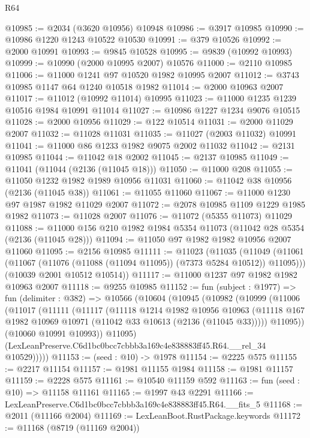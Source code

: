\begin{lexlean}{R64}
\begin{coremodule}
@10985 := @2034 (@3620 @10956) @10948
@10986 := @3917 @10985
@10990 := @10986 @1220 @1243 @10522 @10530
@10991 := @379 @10526
@10992 := @2000 @10991
@10993 := @9845 @10528
@10995 := @9839 (@10992 @10993)
@10999 := @10990 (@2000 @10995 @2007) @10576
@11000 := @2110 @10985
@11006 := @11000 @1241 @97 @10520 @1982 @10995 @2007
@11012 := @3743 @10985 @1147 @64 @1240 @10518 @1982
@11014 := @2000 @10963 @2007
@11017 := @11012 (@10992 @11014) @10995
@11023 := @11000 @1235 @1239 @10516 @1984 @10991 @11014
@11027 := @10986 @1227 @1234 @9076 @10515
@11028 := @2000 @10956
@11029 := @122 @10514
@11031 := @2000 @11029 @2007
@11032 := @11028 @11031
@11035 := @11027 (@2003 @11032) @10991
@11041 := @11000 @86 @1233 @1982 @9075 @2002 @11032
@11042 := @2131 @10985
@11044 := @11042 @18 @2002
@11045 := @2137 @10985
@11049 := @11041 (@11044 (@2136 (@11045 @18)))
@11050 := @11000 @208
@11055 := @11050 @1232 @1982 @1989 @10956 @11031
@11060 := @11042 @38 @10956 (@2136 (@11045 @38))
@11061 := @11055 @11060
@11067 := @11000 @1230 @97 @1987 @1982 @11029 @2007
@11072 := @2078 @10985 @1109 @1229 @1985 @1982
@11073 := @11028 @2007
@11076 := @11072 (@5355 @11073) @11029
@11088 := @11000 @156 @210 @1982 @1984 @5354 @11073 (@11042 @28 @5354 (@2136 (@11045 @28)))
@11094 := @11050 @97 @1982 @1982 @10956 @2007 @11060
@11095 := @2156 @10985
@11111 := @11023
    (@11035
      (@11049 (@11061 (@11067 (@11076 (@11088 (@11094 @11095)) (@7373 @5284 @10512)) @11095)))
      (@10039 @2001 @10512 @10514))
@11117 := @11000 @1237 @97 @1982 @1982 @10963 @2007
@11118 := @9255 @10985
@11152 := fun (subject : @1977) =>
  fun (delimiter : @382) =>
  @10566
    (@10604
      (@10945
        (@10982
          (@10999
            (@11006
              (@11017
                (@11111
                  (@11117
                    (@11118
                      @1214
                      @1982
                      @10956
                      @10963
                      (@11118 @167 @1982 @10969 @10971 (@11042 @33 @10613 (@2136 (@11045 @33)))))
                    @11095))
                (@10060 @10991 @10993))
              @11095)
            (LexLeanPreserve.C6d1bc0bcc7cbbb3a169c4e838883ff45.R64.__rel_34 @10529)))))
@11153 := (seed : @10) -> @1978
@11154 := @2225 @575
@11155 := @2217 @11154
@11157 := @1981 @11155 @1984
@11158 := @1981 @11157
@11159 := @2228 @575
@11161 := @10540 @11159 @592
@11163 := fun (seed : @10) => @11158 @11161
@11165 := @1997 @43 @2291
@11166 := LexLeanPreserve.C6d1bc0bcc7cbbb3a169c4e838883ff45.R64.__fits_5
@11168 := @2011 (@11166 @2004)
@11169 := LexLeanBoot.RustPackage.keywords
@11172 := @11168 (@8719 (@11169 @2004))

\end{coremodule}
\end{lexlean}
